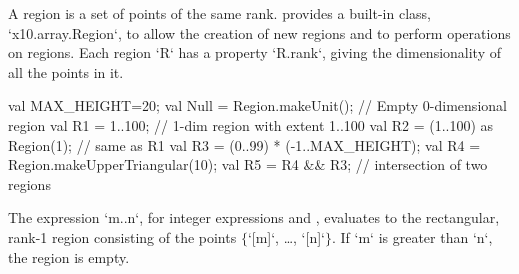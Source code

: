 A region is a set of points of the same rank.  {}\Xten{}
provides a built-in class, \xcd`x10.array.Region`, to allow the
creation of new regions and to perform operations on regions. 
Each region \xcd`R` has a property \xcd`R.rank`, giving the dimensionality of
all the points in it.

\begin{xten}
val MAX_HEIGHT=20;
val Null = Region.makeUnit();  // Empty 0-dimensional region
val R1 = 1..100; // 1-dim region with extent 1..100
val R2 = (1..100) as Region(1); // same as R1
val R3 = (0..99) * (-1..MAX_HEIGHT);
val R4 = Region.makeUpperTriangular(10);
val R5 = R4 && R3; // intersection of two regions
\end{xten}

The expression \xcdmath`m..n`, for integer expressions  and ,
evaluates to the rectangular, rank-1 region consisting of the points
$\{$\xcdmath`[m]`, \dots, \xcdmath`[n]`$\}$. If \xcdmath`m` is greater than
\xcdmath`n`, the region  is empty.




